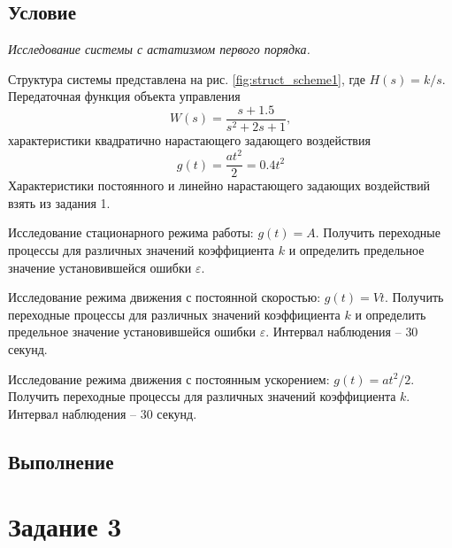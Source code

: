 \documentclass[a4paper, 12pt]{article}
\begin{document}
    \subsection{Условие}
    \textit{Исследование системы с астатизмом первого порядка.}
    \begin{compactitem}
    \item Структура системы представлена на рис. \ref{fig:struct_scheme1}, где
    $H(s)=k/s$. Передаточная функция объекта управления $$W(s)=\dfrac{s+1.5}{s^2+2s+1},$$
    характеристики квадратично нарастающего задающего воздействия $$g(t)=\dfrac{at^2}{2}=0.4t^2$$
    Характеристики постоянного и линейно нарастающего задающих воздействий взять из задания 1.
    \item Исследование стационарного режима работы: $g(t)=A$.
    Получить переходные процессы для различных значений коэффициента $k$ и определить предельное
    значение установившейся ошибки $\varepsilon$.
    \item Исследование режима движения с постоянной скоростью: $g(t)=Vt$.
    Получить переходные процессы для различных значений коэффициента $k$ и определить
    предельное значение установившейся ошибки $\varepsilon$. Интервал наблюдения -- $30$ секунд.
    \item Исследование режима движения с постоянным ускорением: $g(t)=at^2/2$.
    Получить переходные процессы для различных значений коэффициента $k$. Интервал
    наблюдения -- $30$ секунд.
    \end{compactitem}


    \subsection{Выполнение}


    \section{Задание 3}
\end{document}
